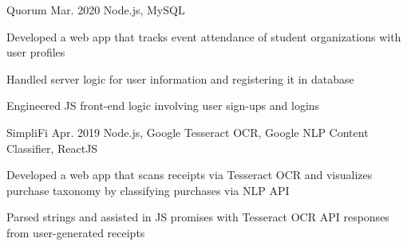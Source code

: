 \begin{cvprojects}
  \cvproject
  {Quorum}
  {\href{https://github.com/KevinIsMyName/Quorum}{\faGithubSquare\acvHeaderIconSep\@KevinIsMyName}}
  {Mar. 2020}
  {Node.js, MySQL}
  {
    \begin{cvitems}
      \item {Developed a web app that tracks event attendance of student organizations with user profiles}
      \item {Handled server logic for user information and registering it in database}
      \item {Engineered JS front-end logic involving user sign-ups and logins}
    \end{cvitems}
  }

  \cvproject
  {SimpliFi}
  {\href{https://github.com/unitehenry/simply-finance}{\faGithubSquare\acvHeaderIconSep{}}}
  {Apr. 2019}
  {Node.js, Google Tesseract OCR, Google NLP Content Classifier, ReactJS}
  {
    \begin{cvitems}
      \item {Developed a web app that scans receipts via Tesseract OCR and visualizes purchase taxonomy by classifying purchases via NLP API}
      \item {Parsed strings and assisted in JS promises with Tesseract OCR API responses from user-generated receipts}
    \end{cvitems}
  }


\end{cvprojects}
